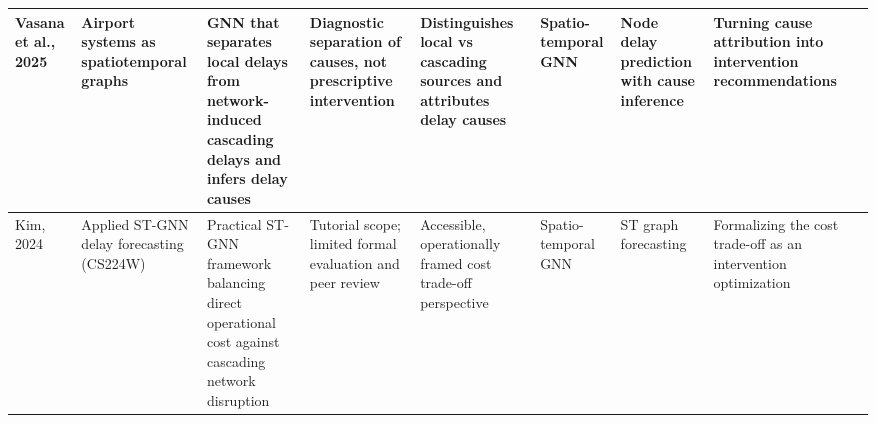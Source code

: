 \documentclass[twocolumn]{article}
\begin{document}
\begin{table}[htbp]
\begin{tabular}{|p{1.5cm}|p{1.5cm}|p{2.5cm}|p{2cm}|p{2cm}|p{1.5cm}|p{1.5cm}|p{1.5cm}|p{1cm}|}
\hline
Vasana et al., 2025 & Airport systems as spatiotemporal graphs & GNN that separates local delays from network-induced cascading delays and infers delay causes & Diagnostic separation of causes, not prescriptive intervention & Distinguishes local vs cascading sources and attributes delay causes & Spatio-temporal GNN & Node delay prediction with cause inference & Turning cause attribution into intervention recommendations & \cite{vasana2025}\\
\hline
Kim, 2024 & Applied ST-GNN delay forecasting (CS224W) & Practical ST-GNN framework balancing direct operational cost against cascading network disruption & Tutorial scope; limited formal evaluation and peer review & Accessible, operationally framed cost trade-off perspective & Spatio-temporal GNN & ST graph forecasting & Formalizing the cost trade-off as an intervention optimization & \cite{kim2024}\\
\hline
\end{tabular}
\end{table}
\end{document}
